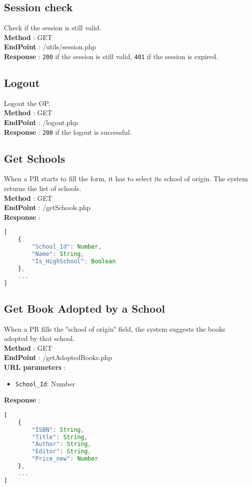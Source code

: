 \subsection{Session check}
Check if the session is still valid.\\
\textbf{Method} : GET \\
\textbf{EndPoint} : /utils/session.php \\
\textbf{Response} : \texttt{200} if the session is still valid, \texttt{401} if the session is expired.

\subsection{Logout}
Logout the OP.\\
\textbf{Method} : GET \\
\textbf{EndPoint} : /logout.php \\
\textbf{Response} : \texttt{200} if the logout is successful.

\subsection{Get Schools}
When a PR starts to fill the form, it has to select its school of origin. The system returns the list of schools.\\
\textbf{Method} : GET \\
\textbf{EndPoint} : /getSchools.php \\
\textbf{Response} :
\begin{lstlisting}[language=JavaScript, label={lst:jscode}, basicstyle=\ttfamily]
[
    {
        "School_Id": Number,
        "Name": String,
        "Is_HighSchool": Boolean
    },
    ...
]
\end{lstlisting}

\subsection{Get Book Adopted by a School}
When a PR fills the "school of origin" field, the system suggests the books adopted by that school.\\
\textbf{Method} : GET \\
\textbf{EndPoint} : /getAdoptedBooks.php \\
\textbf{URL parameters} :
\begin{itemize}
    \item \texttt{School\_Id}: Number
\end{itemize}
\textbf{Response} :
\begin{lstlisting}[language=JavaScript, label={lst:jscode}, basicstyle=\ttfamily]
[
    {
        "ISBN": String,
        "Title": String,
        "Author": String,
        "Editor": String,
        "Price_new": Number
    },
    ...
]
\end{lstlisting}

